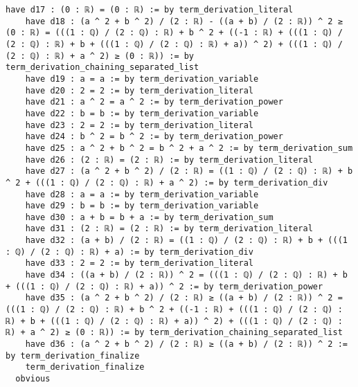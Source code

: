 \documentclass{article}
\begin{document}
\begin{tcolorbox}[colback=white!10, width=\linewidth]
\begin{lstlisting}[language=Lean4]
    have d17 : (0 : ℝ) = (0 : ℝ) := by term_derivation_literal
    have d18 : (a ^ 2 + b ^ 2) / (2 : ℝ) - ((a + b) / (2 : ℝ)) ^ 2 ≥ (0 : ℝ) = (((1 : ℚ) / (2 : ℚ) : ℝ) + b ^ 2 + ((-1 : ℝ) + (((1 : ℚ) / (2 : ℚ) : ℝ) + b + (((1 : ℚ) / (2 : ℚ) : ℝ) + a)) ^ 2) + (((1 : ℚ) / (2 : ℚ) : ℝ) + a ^ 2) ≥ (0 : ℝ)) := by term_derivation_chaining_separated_list
    have d19 : a = a := by term_derivation_variable
    have d20 : 2 = 2 := by term_derivation_literal
    have d21 : a ^ 2 = a ^ 2 := by term_derivation_power
    have d22 : b = b := by term_derivation_variable
    have d23 : 2 = 2 := by term_derivation_literal
    have d24 : b ^ 2 = b ^ 2 := by term_derivation_power
    have d25 : a ^ 2 + b ^ 2 = b ^ 2 + a ^ 2 := by term_derivation_sum
    have d26 : (2 : ℝ) = (2 : ℝ) := by term_derivation_literal
    have d27 : (a ^ 2 + b ^ 2) / (2 : ℝ) = ((1 : ℚ) / (2 : ℚ) : ℝ) + b ^ 2 + (((1 : ℚ) / (2 : ℚ) : ℝ) + a ^ 2) := by term_derivation_div
    have d28 : a = a := by term_derivation_variable
    have d29 : b = b := by term_derivation_variable
    have d30 : a + b = b + a := by term_derivation_sum
    have d31 : (2 : ℝ) = (2 : ℝ) := by term_derivation_literal
    have d32 : (a + b) / (2 : ℝ) = ((1 : ℚ) / (2 : ℚ) : ℝ) + b + (((1 : ℚ) / (2 : ℚ) : ℝ) + a) := by term_derivation_div
    have d33 : 2 = 2 := by term_derivation_literal
    have d34 : ((a + b) / (2 : ℝ)) ^ 2 = (((1 : ℚ) / (2 : ℚ) : ℝ) + b + (((1 : ℚ) / (2 : ℚ) : ℝ) + a)) ^ 2 := by term_derivation_power
    have d35 : (a ^ 2 + b ^ 2) / (2 : ℝ) ≥ ((a + b) / (2 : ℝ)) ^ 2 = (((1 : ℚ) / (2 : ℚ) : ℝ) + b ^ 2 + ((-1 : ℝ) + (((1 : ℚ) / (2 : ℚ) : ℝ) + b + (((1 : ℚ) / (2 : ℚ) : ℝ) + a)) ^ 2) + (((1 : ℚ) / (2 : ℚ) : ℝ) + a ^ 2) ≥ (0 : ℝ)) := by term_derivation_chaining_separated_list
    have d36 : (a ^ 2 + b ^ 2) / (2 : ℝ) ≥ ((a + b) / (2 : ℝ)) ^ 2 := by term_derivation_finalize
    term_derivation_finalize
  obvious

\end{lstlisting}
\end{tcolorbox}
\end{document}
